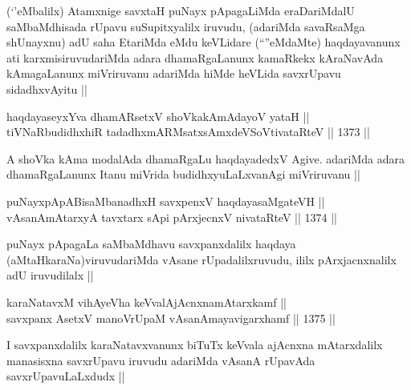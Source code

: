 \begin{artha}
(`\stext'eMbalilx) Atamxnige savxtaH puNayx pApagaLiMda eraDariMdalU saMbaMdhisada rUpavu suSupitxyalilx iruvudu, (adariMda savaRsaMga shUnayxnu) adU saha EtariMda eMdu keVLidare (``\stext''eMdaMte) haqdayavanunx ati karxmisiruvudariMda adara dhamaRgaLanunx kamaRkekx kAraNavAda kAmagaLanunx miVriruvanu adariMda hiMde heVLida savxrUpavu sidadhxvAyitu ||
\end{artha}


\begin{shl}
haqdayaseyxYva dhamARsetxV shoVkakAmAdayoV yataH || \\
tiVNaRbudidhxhiR tadadhxmARMsatxsAmxdeVSoV\s tivataRteV ||  1373 ||  
\end{shl}

\begin{artha}
A shoVka kAma modalAda dhamaRgaLu haqdayadedxV Agive. adariMda adara dhamaRgaLanunx Itanu miVrida budidhxyuLaLxvanAgi miVriruvanu ||
\end{artha}


\begin{shl}
puNayxpApABisaMbanadhxH savxpenxV haqdayasaMgateVH || \\
vAsanAmAtarxyA tavxtarx sA\s pi pArxjecnxV nivataRteV ||  1374 ||  
\end{shl}

\begin{artha}
puNayx pApagaLa saMbaMdhavu savxpanxdalilx haqdaya (aMtaHkaraNa)viruvudariMda vAsane rUpadalilxruvudu, ililx pArxjacnxnalilx adU iruvudilalx ||
\end{artha}


\begin{shl}
karaNatavxM vihAyeVha keVvalAjAcnxnamAtarxkamf || \\
savxpanx AsetxV manoVrUpaM vAsanAmayavigarxhamf ||  1375 ||  
\end{shl}

\begin{artha}
I savxpanxdalilx karaNatavxvanunx biTuTx keVvala ajAcnxna mAtarxdalilx manasisxna savxrUpavu iruvudu adariMda vAsanA rUpavAda savxrUpavuLaLxdudx ||
\end{artha}

